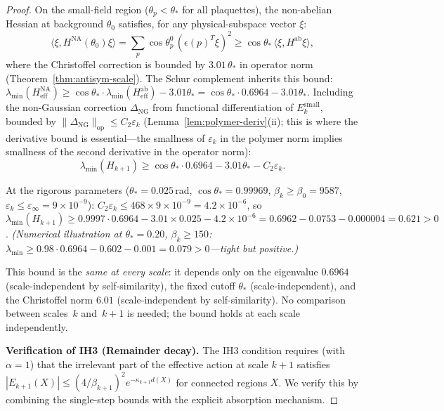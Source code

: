 \documentclass[11pt]{article}
\theoremstyle{definition}
\begin{document}
\begin{proof}
On the small-field region ($\theta_p<\theta_*$ for all plaquettes),
the non-abelian Hessian at background $\theta_0$ satisfies, for any
physical-subspace vector $\xi$:
\begin{equation}
\langle\xi,H^{\mathrm{NA}}(\theta_0)\xi\rangle
=\sum_p\cos\theta_p^0\,(\epsilon(p)^T\xi)^2
\ge\cos\theta_*\,\langle\xi,H^{\mathrm{ab}}\xi\rangle,
\end{equation}
where the Christoffel correction is bounded by
$3.01\,\theta_*$ in operator norm
(Theorem~\ref{thm:antisym-scale}).  The Schur complement inherits
this bound: $\lambda_{\min}(H_{\mathrm{eff}}^{\mathrm{NA}})
\ge\cos\theta_*\cdot\lambda_{\min}(H_{\mathrm{eff}}^{\mathrm{ab}})
-3.01\theta_*
=\cos\theta_*\cdot 0.6964-3.01\theta_*$.  Including the non-Gaussian correction
$\Delta_{\mathrm{NG}}$ from functional differentiation of
$E_k^{\mathrm{small}}$, bounded by
$\|\Delta_{\mathrm{NG}}\|_{\mathrm{op}}
\le C_2\varepsilon_k$ (Lemma~\ref{lem:polymer-deriv}(ii);
this is where the derivative bound is essential---the
smallness of $\varepsilon_k$ in the polymer norm implies
smallness of the second derivative in the operator norm):
\begin{equation}
\lambda_{\min}(H_{k+1})
\ge\cos\theta_*\cdot 0.6964-3.01\theta_*-C_2\varepsilon_k.
\end{equation}

At the rigorous parameters ($\theta_*=0.025$\,rad, $\cos\theta_*=0.99969$,
$\beta_k\ge\beta_0=9587$, $\varepsilon_k\le\varepsilon_\infty
=9\times 10^{-9}$):
$C_2\varepsilon_k\le 468\times 9\times 10^{-9}=4.2\times 10^{-6}$,
so
$\lambda_{\min}(H_{k+1})\ge 0.9997\cdot 0.6964-3.01\times 0.025
-4.2\times 10^{-6}
=0.6962-0.0753-0.000004=0.621>0$.
\emph{(Numerical illustration at $\theta_*=0.20$, $\beta_k\ge 150$:
$\lambda_{\min}\ge 0.98\cdot 0.6964-0.602-0.001=0.079>0$---tight
but positive.)}

This bound is the \emph{same at every scale}:
it depends only on the eigenvalue $0.6964$
(scale-independent by self-similarity), the fixed cutoff
$\theta_*$ (scale-independent), and the Christoffel norm $6.01$
(scale-independent by self-similarity).  No comparison between
scales~$k$ and~$k+1$ is needed; the bound holds at
each scale independently.

\medskip\noindent\textbf{Verification of IH3 (Remainder decay).}
The IH3 condition requires (with $\alpha=1$) that the irrelevant part
of the effective action at scale $k+1$ satisfies
$|E_{k+1}(X)|\le(4/\beta_{k+1})^{2}e^{-\kappa_{k+1} d(X)}$
for connected regions $X$.  We verify this by combining the
single-step bounds with the explicit absorption mechanism.


\end{proof}
\end{document}
